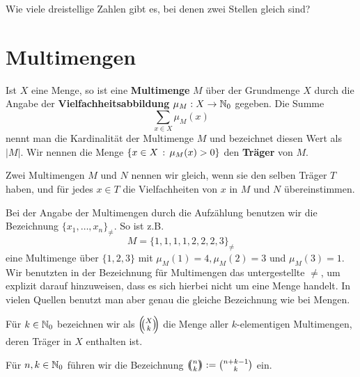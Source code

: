 \begin{aufg}
	Wie viele dreistellige Zahlen gibt es, bei denen zwei Stellen gleich sind? 
\end{aufg} 

\section{Multimengen} 

\begin{defn}
Ist $X$ eine Menge, so ist eine \textbf{Multimenge} $M$ über der Grundmenge $X$ durch die Angabe der \textbf{Vielfachheitsabbildung} $\mu_M : X \to \mathbb{N}_0$ gegeben. Die Summe
\[
	\sum_{x \in X} \mu_M(x)
\]
nennt man die Kardinalität der Multimenge $M$ und bezeichnet diesen Wert als $|M|$.  Wir nennen die Menge $\left\{  x \in X \,:\, \mu_M(x)>0 \right\}$ den \textbf{Träger} von $M$.

Zwei Multimengen $M$ und $N$ nennen wir gleich, wenn sie den selben Träger $T$ haben, und für jedes $x \in T$ die Vielfachheiten von $x$ in $M$ und $N$ übereinstimmen.
\end{defn} 

\begin{bem}
	Bei der Angabe der Multimengen durch die Aufzählung benutzen wir die Bezeichnung $\{x_1,\ldots,x_n\}_{\ne}$. So ist z.B. 
	\[
			M = \{1,1,1,1,2,2,2,3\}_{\ne}
	\]
	eine Multimenge über $\{1,2,3\}$ mit $\mu_M(1) =4, \mu_M(2)=3$ und $\mu_M(3)=1$. Wir benutzten in der Bezeichnung für Multimengen das untergestellte $\ne$, um explizit darauf hinzuweisen, dass es sich hierbei nicht um eine Menge handelt. In vielen Quellen benutzt man aber genau die gleiche Bezeichnung wie bei Mengen. 
\end{bem}

\begin{defn}
	Für $k \in \mathbb{N}_0$ bezeichnen wir als $\left(\!\!\binom{X}{k}\!\!\right)$ die Menge aller $k$-elementigen Multimengen, deren Träger in  $X$ enthalten ist. 

	Für $n,k \in \mathbb{N}_0$ führen wir die Bezeichnung $\left(\!\!\binom{n}{k}\!\!\right) := \binom{n+k-1}{k}$ ein. 
\end{defn} 

